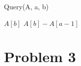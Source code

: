 \documentclass[11pt]{article}
\begin{document}
\begin{algorithm}
\caption{Query(A, a, b)}\label{Query}
    \begin{algorithmic}[1]
            \State \Return $A[b]$
        \Else
            \State \Return $A[b] - A[a-1]$
        \EndIf
        \EndProcedure
    \end{algorithmic}
\end{algorithm}

\section{Problem 3}

%
% 
% 
\end{document}

